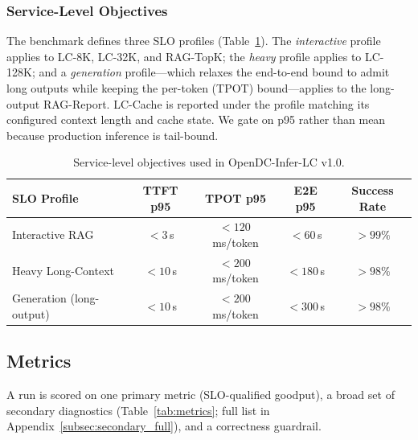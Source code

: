 \subsubsection{Service-Level Objectives}
\label{subsec:slo}
The benchmark defines three SLO profiles (Table~\ref{tab:slo}). The
\emph{interactive} profile applies to LC-8K, LC-32K, and RAG-TopK; the \emph{heavy}
profile applies to LC-128K; and a \emph{generation} profile---which relaxes the
end-to-end bound to admit long outputs while keeping the per-token (TPOT)
bound---applies to the long-output RAG-Report. LC-Cache is reported under the
profile matching its configured context length and cache state. We gate on p95
rather than mean because production inference is tail-bound.

\begin{table}[t]
\centering
\caption{Service-level objectives used in OpenDC-Infer-LC v1.0.}
\label{tab:slo}
\begin{tabular}{lcccc}
\toprule
\textbf{SLO Profile} & \textbf{TTFT p95} & \textbf{TPOT p95} & \textbf{E2E p95} & \textbf{Success Rate} \\
\midrule
Interactive RAG & $<3$\,s & $<120$\,ms/token & $<60$\,s & $>99\%$ \\
Heavy Long-Context & $<10$\,s & $<200$\,ms/token & $<180$\,s & $>98\%$ \\
Generation (long-output) & $<10$\,s & $<200$\,ms/token & $<300$\,s & $>98\%$ \\
\bottomrule
\end{tabular}
\end{table}

\subsection{Metrics}
\label{subsec:metrics}
A run is scored on one primary metric (SLO-qualified goodput), a broad set of
secondary diagnostics (Table~\ref{tab:metrics}; full list in
Appendix~\ref{subsec:secondary_full}), and a correctness guardrail.

